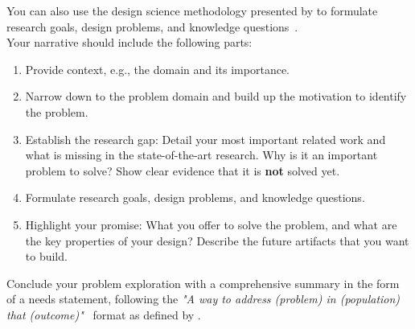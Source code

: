 \begin{tcolorbox}[breakable]
	You can also use the design science methodology presented by \citeauthor{wieringa2014design} to formulate research goals, design problems, and knowledge questions~\cite{wieringa2014design}.
	\\
	Your narrative should include the following parts:
	\begin{enumerate}
		\item Provide context, e.g., the domain and its importance.
		\item Narrow down to the problem domain and build up the motivation to identify the problem.
		\item Establish the research gap: Detail your most important related work and what is missing in the state-of-the-art research. Why is it an important problem to solve? Show clear evidence that it is \textbf{not} solved yet.
		\item Formulate research goals, design problems, and knowledge questions.
		\item Highlight your promise: What you offer to solve the problem, and what are the key properties of your design? Describe the future artifacts that you want to build.
	\end{enumerate}
	Conclude your problem exploration with a comprehensive summary in the form of a needs statement, following the \textit{"A way to address (problem) in (population) that (outcome)"}~\cite{yock2015biodesign} format as defined by \citeauthor{yock2015biodesign}.
\end{tcolorbox}

